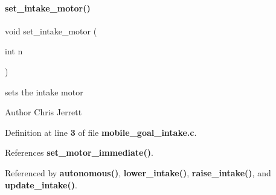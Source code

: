 \paragraph{set\+\_\+intake\+\_\+motor()}
{\footnotesize\ttfamily void set\+\_\+intake\+\_\+motor (\begin{DoxyParamCaption}\item[{int}]{n }\end{DoxyParamCaption})}



sets the intake motor 

\begin{DoxyAuthor}{Author}
Chris Jerrett 
\end{DoxyAuthor}


Definition at line \textbf{ 3} of file \textbf{ mobile\+\_\+goal\+\_\+intake.\+c}.



References \textbf{ set\+\_\+motor\+\_\+immediate()}.



Referenced by \textbf{ autonomous()}, \textbf{ lower\+\_\+intake()}, \textbf{ raise\+\_\+intake()}, and \textbf{ update\+\_\+intake()}.


